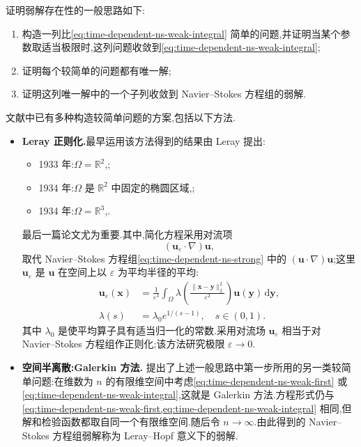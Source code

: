 \begin{note}[证明弱解存在性的一般思路]\label{note:time-dependent-ns-existence-strategy}
证明弱解存在性的一般思路如下:
\begin{enumerate}
  \item 构造一列比\cref{eq:time-dependent-ns-weak-integral} 简单的问题,并证明当某个参数取适当极限时,这列问题收敛到\cref{eq:time-dependent-ns-weak-integral};
  \item 证明每个较简单的问题都有唯一解;
  \item 证明这列唯一解中的一个子列收敛到 Navier--Stokes 方程组的弱解.
\end{enumerate}
\end{note}

\begin{note}[较简单问题的构造方式]\label{note:time-dependent-ns-simpler-problems}
文献中已有多种构造较简单问题的方案,包括以下方法.
\begin{itemize}
  \item \textbf{Leray 正则化.}最早运用该方法得到的结果由 Leray 提出:
  \begin{itemize}
    \item 1933 年:$\Omega=\mathbb{R}^2$,\textcite{Leray1933};
    \item 1934 年:$\Omega$ 是 $\mathbb{R}^2$ 中固定的椭圆区域,\textcite{Leray1934a};
    \item 1934 年:$\Omega=\mathbb{R}^3$,\textcite{Leray1934b}.
  \end{itemize}
  最后一篇论文尤为重要.其中,简化方程采用对流项
  \[
    (\bm{u}_\varepsilon\cdot\nabla)\bm{u},
  \]
  取代 Navier--Stokes 方程组\cref{eq:time-dependent-ns-strong} 中的
  $(\bm{u}\cdot\nabla)\bm{u}$;这里 $\bm{u}_\varepsilon$ 是 $\bm{u}$ 在空间上以 $\varepsilon$ 为平均半径的平均:
  \[
    \begin{aligned}
    \bm{u}_\varepsilon(\bm{x})
      &=\frac{1}{\varepsilon^3}
        \int_\Omega
          \lambda\!\left(
            \frac{\lVert\bm{x}-\bm{y}\rVert_2^2}{\varepsilon^2}
          \right)
          \bm{u}(\bm{y})\,\mathrm{d}\bm{y},\\
    \lambda(s)&=\lambda_0 e^{1/(s-1)},\quad s\in(0,1).
    \end{aligned}
  \]
  其中 $\lambda_0$ 是使平均算子具有适当归一化的常数.采用对流场 $\bm{u}_\varepsilon$ 相当于对 Navier--Stokes 方程组作正则化;该方法研究极限 $\varepsilon\to0$.

  \item \textbf{空间半离散:Galerkin 方法.}\textcite{Hopf1951} 提出了上述一般思路中第一步所用的另一类较简单问题:在维数为 $n$ 的有限维空间中考虑\cref{eq:time-dependent-ns-weak-first} 或\cref{eq:time-dependent-ns-weak-integral},这就是 Galerkin 方法.方程形式仍与\cref{eq:time-dependent-ns-weak-first,eq:time-dependent-ns-weak-integral} 相同,但解和检验函数都取自同一个有限维空间.随后令 $n\to\infty$.由此得到的 Navier--Stokes 方程组弱解称为 Leray--Hopf 意义下的弱解.


\end{itemize}
\end{note}
